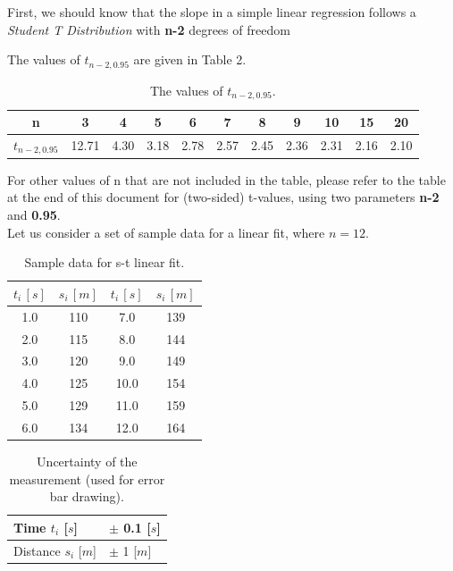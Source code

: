 \documentclass[12pt]{article}
\begin{document}
First, we should know that the slope in a simple linear regression follows a \textit{Student T Distribution} with \textbf{n-2} degrees of freedom

The values of $t_{n-2,0.95}$ are given in Table 2.

\begin{table}[H]
\centering
\begin{tabular}{c|cccccccccc}
\hline
n &3 &4 &5 &6 &7 &8 &9 &10 &15 &20 \\\hline\hline
$t_{n-2,0.95}$ & 12.71 &4.30 &3.18 &2.78 &2.57 &2.45 &2.36 &2.31 &2.16 &2.10 \\\hline
\end{tabular}
\caption{The values of $t_{n-2,0.95}$.}
\end{table}


For other values of n that are not included in the table, please refer to the table at the end of this document for (two-sided) t-values, using two parameters \textbf{n-2} and \textbf{0.95}.
\\

Let us consider a set of sample data for a linear fit, where $n=12$.


\begin{table}[h]
\centering
\begin{tabular}{cc|cc}
\hline
$t_i\,[s]$ &$s_i\,[m]$ &$t_i\,[s]$ &$s_i\,[m]$
\\\hline\hline
1.0  &110  &7.0   &139
\\
2.0  &115   &8.0   &144   
\\
3.0  &120   &9.0   &149   
\\
4.0  &125   &10.0  &154   
\\
5.0  &129   &11.0  &159   
\\
6.0  &134   &12.0  &164  \\

\hline
\end{tabular}
\caption{Sample data for s-t linear fit.}
\end{table}

\begin{table}[h]
\centering
\begin{tabular}{l|l}

\hline
Time $t_i$ [$s$]& $\pm$ 0.1 [$s$] \\\hline
Distance $s_i$ [$m$]& $\pm$ 1 [$m$]\\
\hline
\end{tabular}
\caption{Uncertainty of the measurement (used for error bar drawing).}
\end{table}
\end{document}
